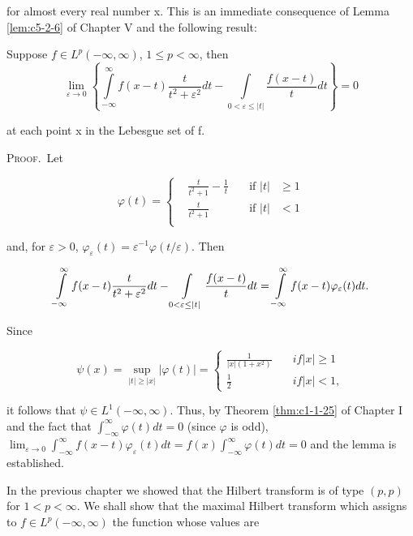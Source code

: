 for almost every real number x. This is an immediate consequence of Lemma \ref{lem:c5-2-6} of Chapter V and the following result:

\begin{lemma}
\label{lem:c6-1-2}
Suppose $f \in L^p(-\infty, \infty)$, $1 \leq p < \infty$, then
\[
\lim_{\varepsilon\to0}\left\{\int\limits_{-\infty}^{\infty}f(x-t)\frac{t}{t^{2}+\varepsilon^{2}}dt-\int\limits_{0<\varepsilon\leq|t|}\frac{f(x-t)}{t}dt\right\}=0
\]

at each point x in the Lebesgue set of f.
\end{lemma}

\textsc{Proof.}\ Let

\[
\varphi(t)=\left\{\begin{aligned}{}&{{}\frac{t}{t^{2}+1}-\frac{1}{t}\quad}&{\text{if }|t|}&{{}\geq1}\\ {}&{{}\frac{t}{t^{2}+1}}&{\text{if }|t|}&{{}<1}\\ \end{aligned}\right.
\]

and, for $\varepsilon > 0$, $\varphi_{\varepsilon}(t) = \varepsilon^{-1}\varphi(t/\varepsilon)$. Then

\[
\intop_{-\infty}^{\infty}f(x-t){\frac{t}{t^{2}+\varepsilon^{2}}}d t-\intop_{0<\varepsilon\leq|t|}{\frac{f(x-t)}{t}}d t=\intop_{-\infty}^{\infty}f(x-t)\varphi_{\varepsilon}(t)d t.
\]

Since

\begin{equation}\label{eq:c6-1-3}
\psi(x)=\sup_{|t|\geq|x|}\left|\varphi(t)\right|=\left\{\begin{matrix}\displaystyle\frac{1}{|x|(1+x^{2})}\quad&if|x|\geq1\\ \displaystyle\frac{1}{2}\quad&if|x|<1,\end{matrix}\right.
\end{equation}

it follows that $\psi\in L^{1}(-\infty,\infty)$. Thus, by Theorem \ref{thm:c1-1-25} of Chapter I and the fact that $\int_{-\infty}^{\infty}\varphi(t)dt=0$ (since $\varphi$ is odd), $\lim_{\varepsilon\to0}\int_{-\infty}^{\infty}f(x-t)\varphi_{\varepsilon}(t)dt=f(x)\int_{-\infty}^{\infty}\varphi(t)dt=0$ and the lemma is established.

In the previous chapter we showed that the Hilbert transform is of type $(p, p)$ for $1 < p < \infty$. We shall show that the maximal Hilbert transform which assigns to $f \in L^p(-\infty, \infty)$ the function whose values are

